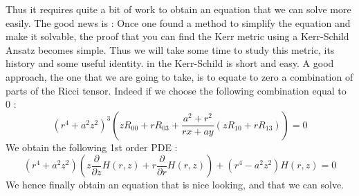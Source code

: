 \documentclass[a4paper,12pt]{article}
\theoremstyle{definition}
\begin{document}
Thus it requires quite a bit of work to obtain an equation that we can solve more easily.
The good news is : Once one found a method to simplify the equation and make it solvable, the proof that you can find the Kerr metric using a Kerr-Schild Ansatz becomes simple.
Thus we will take some time to study this metric, its history and some useful identity. in the Kerr-Schild is short and easy.
A good approach, the one that we are going to take, is to equate to zero a combination of parts of the Ricci tensor.
Indeed if we choose the following combination equal to $0$ :
\begin{equation}
	(r^4+a^2z^2)^3(zR_{00}+rR_{03}+\frac{a^2+r^2}{rx+ay}(zR_{10}+rR_{13}))=0
\end{equation}
We obtain the following 1st order PDE :
\begin{equation}\label{Kerr:equation}
	(r^4+a^2z^2)(z \frac{\partial}{\partial z}H(r,z)+r\frac{\partial}{\partial r}H(r,z))+(r^4-a^2 z^2) H(r,z)=0
\end{equation}
We hence finally obtain an equation that is nice looking, and that we can solve.
\end{document}
